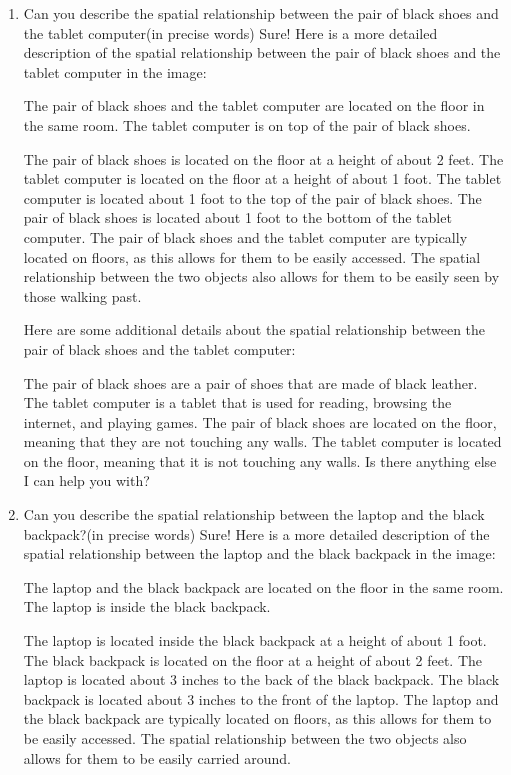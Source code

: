 \begin{enumerate}
    \item Can you describe the spatial relationship between the pair of black shoes and the tablet computer(in precise words)
    \subitem Sure! Here is a more detailed description of the spatial relationship between the pair of black shoes and the tablet computer in the image:

    The pair of black shoes and the tablet computer are located on the floor in the same room. The tablet computer is on top of the pair of black shoes.
    
    The pair of black shoes is located on the floor at a height of about 2 feet.
    The tablet computer is located on the floor at a height of about 1 foot.
    The tablet computer is located about 1 foot to the top of the pair of black shoes.
    The pair of black shoes is located about 1 foot to the bottom of the tablet computer.
    The pair of black shoes and the tablet computer are typically located on floors, as this allows for them to be easily accessed. The spatial relationship between the two objects also allows for them to be easily seen by those walking past.
    
    Here are some additional details about the spatial relationship between the pair of black shoes and the tablet computer:
    
    The pair of black shoes are a pair of shoes that are made of black leather.
    The tablet computer is a tablet that is used for reading, browsing the internet, and playing games.
    The pair of black shoes are located on the floor, meaning that they are not touching any walls.
    The tablet computer is located on the floor, meaning that it is not touching any walls.
    Is there anything else I can help you with?
    \item Can you describe the spatial relationship between the laptop and the black backpack?(in precise words)
    \subitem 
    Sure! Here is a more detailed description of the spatial relationship between the laptop and the black backpack in the image:
    
    The laptop and the black backpack are located on the floor in the same room. The laptop is inside the black backpack.
    
    The laptop is located inside the black backpack at a height of about 1 foot.
    The black backpack is located on the floor at a height of about 2 feet.
    The laptop is located about 3 inches to the back of the black backpack.
    The black backpack is located about 3 inches to the front of the laptop.
    The laptop and the black backpack are typically located on floors, as this allows for them to be easily accessed. The spatial relationship between the two objects also allows for them to be easily carried around.
    

\end{enumerate}
